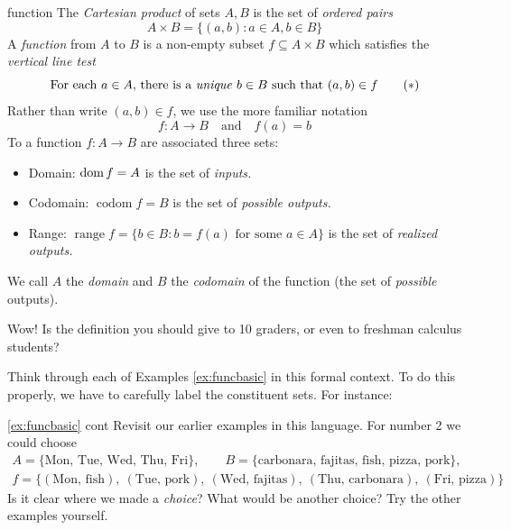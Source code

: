 \begin{defn}{}{function}
The \emph{Cartesian product} of sets $A,B$ is the set of \emph{ordered pairs}
\[A\times B=\bigl\{(a,b):a\in A,b\in B\bigr\}\]
A \emph{function} from $A$ to $B$ is a non-empty subset $f\subseteq A\times B$ which satisfies the \emph{vertical line test}
\[\text{For each $a\in A$, there is a \emph{unique} $b\in B$ such that $(a,b)\in f$} \tag{$\ast$}\]
Rather than write $(a,b)\in f$, we use the more familiar notation
\[f:A\to B\quad\text{and}\quad f(a)=b\]
To a function $f:A\to B$ are associated three sets:\footnotemark
\begin{itemize}\itemsep0pt
  \item Domain: $\operatorname{dom} f=A$ is the set of \emph{inputs.}
  \item Codomain: $\operatorname{codom} f=B$ is the set of \emph{possible outputs.}
  \item Range: $\operatorname{range} f=\{b\in B:b=f(a)\text{ for some }a\in A\}$ is the set of \emph{realized outputs.}
\end{itemize}
We call $A$ the \emph{domain} and $B$ the \emph{codomain} of the function (the set of \emph{possible} outputs).
\end{defn}




Wow! Is the definition you should give to 10\th{} graders, or even to freshman calculus students?
\smallbreak

Think through each of Examples \ref{ex:funcbasic} in this formal context. To do this properly, we have to carefully label the constituent sets. For instance:
 
\begin{examples*}{\ref{ex:funcbasic} cont}{}
Revisit our earlier examples in this language. For number 2 we could choose
\begin{gather*}
A=\bigl\{\text{Mon, Tue, Wed, Thu, Fri}\bigr\},\qquad B=\bigl\{\text{carbonara, fajitas, fish, pizza, pork}\bigr\},\\[5pt]
f=\bigl\{(\text{Mon,\ fish}),\ (\text{Tue,\ pork}),\ (\text{Wed,\ fajitas}),\ (\text{Thu,\ carbonara}),\ (\text{Fri,\ pizza})\bigr\}
\end{gather*}
Is it clear where we made a \emph{choice}? What would be another choice? Try the other examples yourself.
\end{examples*}


